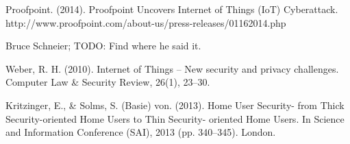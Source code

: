 \documentclass[10pt,journal,compsoc]{IEEEtran}
\begin{document}
\begin{thebibliography}{1}
Proofpoint. (2014). Proofpoint Uncovers Internet of Things (IoT) Cyberattack. http://www.proofpoint.com/about-us/press-releases/01162014.php

Bruce Schneier; TODO: Find where he said it.

Weber, R. H. (2010). Internet of Things – New security and privacy challenges. Computer Law \& Security Review, 26(1), 23–30. 

Kritzinger, E., \& Solms, S. (Basie) von. (2013). Home User Security- from Thick Security-oriented Home Users to Thin Security- oriented Home Users. In Science and Information Conference (SAI), 2013 (pp. 340–345). London.

\end{thebibliography}



\end{document}
